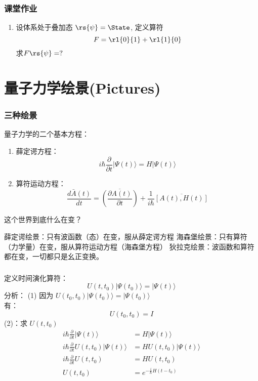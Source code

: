 \begin{frame} 
    \frametitle{课堂作业}
    \begin{enumerate}
        \item 设体系处于叠加态 $\rs{\psi}=\State$, 定义算符
        \[F= \rl{0}{1}+\rl{1}{0}\]
        求$F\rs{\psi}=?$  
    \end{enumerate}
\end{frame} 

\section{量子力学绘景(Pictures)}

\begin{frame}  
    \frametitle{三种绘景}
    量子力学的二个基本方程：  
    \begin{enumerate}
        \item 薛定谔方程：$$ i\hbar \frac{\partial }{\partial t} |\Psi(t)\rangle = H|\Psi(t)\rangle $$
        \item 算符运动方程：$$ \frac{d\bar{A}(t)}{dt}=\overline{(\frac{\partial A(t) }{\partial t})}  +\frac{1}{i\hbar} \overline{[A(t),H(t)]}$$
    \end{enumerate}
    这个世界到底什么在变？\\
    \begin{itemize}
        \done 薛定谔绘景：只有波函数（态）在变，服从薛定谔方程
        \done 海森堡绘景：只有算符（力学量）在变，服从算符运动方程（海森堡方程）
        \done 狄拉克绘景：波函数和算符都在变，一切都只是幺正变换。
    \end{itemize}
\end{frame} 

\begin{frame}  
    \frametitle{}  
    定义时间演化算符：
    $$ U(t,t_0) |\Psi(t_0)\rangle = |\Psi(t)\rangle  $$
    \alert{分析}：
    (1) 因为 $ U(t_0,t_0) |\Psi(t_0)\rangle = |\Psi(t_0)\rangle  $ \\
     有：$$ U(t_0,t_0)=I $$
    (2)：求 $ U(t,t_0)$
    $$ \begin{aligned}
        i\hbar \frac{\partial }{\partial t} |\Psi(t)\rangle &= H|\Psi(t)\rangle  \\
        i\hbar \frac{\partial }{\partial t}  U(t,t_0) |\Psi(t)\rangle &= H U(t,t_0) |\Psi(t)\rangle  \\
        i\hbar \frac{\partial }{\partial t}  U(t,t_0)  &= H U(t,t_0)  \\
        U(t,t_0)  &= e^{-\frac{i}{\hbar} H(t-t_0)}  \\
    \end{aligned} $$
\end{frame} 

